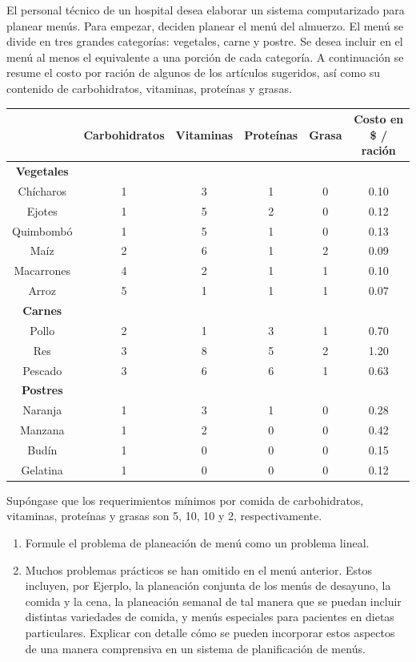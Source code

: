 \begin{Ejer}
El personal t\'ecnico de un hospital desea elaborar un sistema computarizado para planear men\'us. Para empezar, deciden planear el men\'u del almuerzo. El men\'u se divide en tres grandes categor\'ias: vegetales, carne y postre. Se desea incluir en el men\'u al menos el equivalente a una porci\'on de cada categor\'ia. A continuaci\'on se resume el costo por raci\'on de algunos de los art\'iculos sugeridos, as\'i como su contenido de carbohidratos, vitaminas, prote\'inas y grasas.

\begin{center}
\begin{tabular}{c|cccc|c}
 & Carbohidratos & Vitaminas & Prote\'inas & Grasa & Costo en \$ / raci\'on \\
\hline
\textbf{Vegetales} \\
Ch\'icharos & 1 & 3 & 1 & 0 & 0.10 \\
Ejotes & 1 & 5 & 2 & 0 & 0.12 \\
Quimbomb\'o & 1 & 5 & 1 & 0 & 0.13 \\
Ma\'iz & 2 & 6 & 1 & 2 & 0.09 \\
Macarrones & 4 & 2 & 1 & 1 & 0.10 \\
Arroz & 5 & 1 & 1 & 1 & 0.07 \\
\hline
\textbf{Carnes} \\
Pollo & 2 & 1 & 3 & 1 & 0.70 \\
Res & 3 & 8 & 5 & 2 & 1.20 \\
Pescado & 3 & 6 & 6 & 1 & 0.63 \\
\hline
\textbf{Postres} \\
Naranja & 1 & 3 & 1 & 0 & 0.28 \\
Manzana & 1 & 2 & 0 & 0 & 0.42 \\
Bud\'in & 1 & 0 & 0 & 0 & 0.15 \\
Gelatina & 1 & 0 & 0 & 0 & 0.12 \\
\end{tabular}
\end{center}

Sup\'ongase que los requerimientos m\'inimos por comida de carbohidratos, vitaminas, prote\'inas y grasas son 5, 10, 10 y 2, respectivamente.

\begin{enumerate}
\item Formule el problema de planeaci\'on de men\'u como un problema lineal.
\item Muchos problemas pr\'acticos se han omitido en el men\'u anterior. Estos incluyen, por Ejerplo, la planeaci\'on conjunta de los men\'us de desayuno, la comida y la cena, la planeaci\'on semanal de tal manera que se puedan incluir distintas variedades de comida, y men\'us especiales para pacientes en dietas particulares. Explicar con detalle c\'omo se pueden incorporar estos aspectos de una manera comprensiva en un sistema de planificaci\'on de men\'us.
\end{enumerate}
\end{Ejer}




